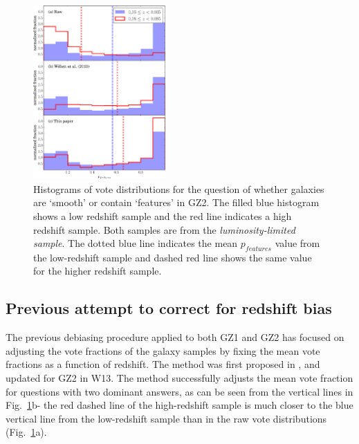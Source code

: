 \documentclass[useAMS,usenatbib]{mn2e}
\begin{document}
\begin{figure}
		\centering

        \includegraphics[width=0.45\textwidth]{Images/Bias/Biases/comparison_histogram.pdf}

        \caption{Histograms of vote distributions for the question of whether galaxies are `smooth' or contain `features' in GZ2. The filled blue histogram shows a low redshift sample and the red line indicates a high redshift sample. Both samples are from the \textit{luminosity-limited sample}. The dotted blue line indicates the mean $p_{features}$ value from the low-redshift sample and dashed red line shows the same value for the higher redshift sample.}

        \label{fig:vote_histograms}

\end{figure}
\subsection{Previous attempt to correct for redshift bias}
\label{sec:previous_method}

The previous debiasing procedure applied to both GZ1 and GZ2 has focused on adjusting the vote fractions of the galaxy samples by fixing the mean vote fractions as a function of redshift. The method was first proposed in \cite{Bamford_09}, and updated for GZ2 in W13. The method successfully adjusts the mean vote fraction for questions with two dominant answers, as can be seen from the vertical lines in Fig.~\ref{fig:vote_histograms}b- the red dashed line of the high-redshift sample is much closer to the blue vertical line from the low-redshift sample than in the raw vote distributions (Fig.~\ref{fig:vote_histograms}a).
\end{document}
